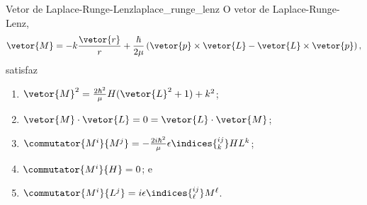 \begin{theorem}{Vetor de Laplace-Runge-Lenz}{laplace_runge_lenz}
   O vetor de Laplace-Runge-Lenz,
   \begin{equation*}
      \vetor{M} = -k \frac{\vetor{r}}{r} + \frac{\hbar}{2\mu} \left(\vetor{p} \times \vetor{L} - \vetor{L} \times \vetor{p}\right),
   \end{equation*}
   satisfaz
   \begin{enumerate}[label=(\alph*)]
       \item \(\vetor{M}^2 = \frac{2\hbar^2}{\mu} H(\vetor{L}^2 + 1) + k^2\);
       \item \(\vetor{M} \cdot \vetor{L} = 0 = \vetor{L}\cdot\vetor{M}\);
       \item \(\commutator{M^i}{M^j} = -\frac{2i \hbar^2}{\mu} \epsilon\indices{^{ij}_k} H L^k\);
       \item \(\commutator{M^i}{H} = 0\); e 
       \item \(\commutator{M^i}{L^j} = i \epsilon\indices{^{ij}_\ell} M^\ell\).
   \end{enumerate}
\end{theorem}
